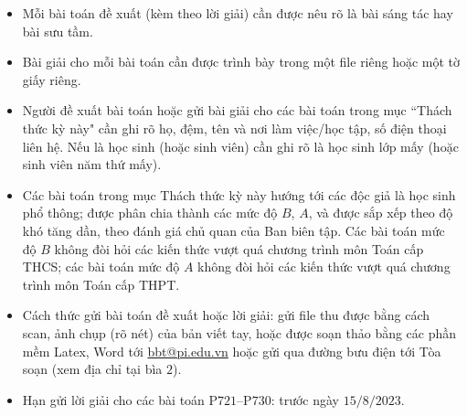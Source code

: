 \thispagestyle{thachthuctoanhocnone}
\pagestyle{thachthuctoanhoc}
\everymath{\color{thachthuctoanhoc}}
\graphicspath{{../thachthuctoanhoc/pic/}}
\begingroup
{}
\centering
\vspace*{4cm}
\endgroup
\vspace*{-8pt}
\begin{tBox}
	\begin{itemize}[leftmargin = 13pt, itemsep = 1.0pt] 
		\item Mỗi bài toán đề xuất (kèm theo lời giải) cần được nêu rõ là bài sáng tác hay bài sưu tầm.
		\item Bài giải cho mỗi bài toán cần được trình bày trong một file riêng hoặc
		một tờ giấy riêng.
		\item  Người đề xuất bài toán hoặc gửi bài giải cho các bài toán trong mục ``Thách thức kỳ này" cần ghi rõ họ, đệm, tên và nơi làm việc/học tập, số điện thoại liên hệ. Nếu là học sinh (hoặc sinh viên) cần ghi rõ là học sinh lớp mấy (hoặc sinh viên năm thứ mấy).
		\item Các bài toán trong mục Thách thức kỳ này hướng tới các độc giả là học sinh phổ thông; được phân chia thành các mức độ $B$, $A$, và được sắp xếp theo độ khó tăng dần, theo đánh giá chủ quan của Ban biên tập. Các bài toán mức độ $B$ không đòi hỏi các kiến thức vượt quá chương trình môn Toán cấp THCS; các bài toán mức độ $A$ không đòi hỏi các kiến thức vượt quá chương trình môn Toán cấp THPT.
		\item Cách thức gửi bài toán đề xuất hoặc lời giải: gửi file thu được bằng cách scan, ảnh chụp (rõ nét) của bản viết tay, hoặc được soạn thảo bằng các phần mềm Latex, Word tới \url{bbt@pi.edu.vn} hoặc gửi qua đường bưu điện tới Tòa soạn (xem địa chỉ tại bìa $2$).
		\item Hạn gửi lời giải cho các bài toán P$721$--P$730$: trước ngày $15/8/2023$.
	\end{itemize}
\end{tBox}
